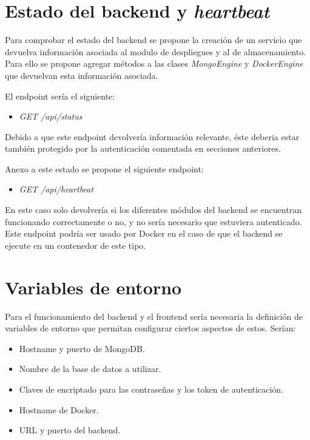 \section{Estado del backend y \textit{heartbeat}}


Para comprobar el estado del backend se propone la creación de un servicio que devuelva información asociada al modulo de despliegues y al de almacenamiento. Para ello se propone agregar métodos a las clases \textit{MongoEngine} y \textit{DockerEngine} que devuelvan esta información asociada.

\bigskip
El endpoint sería el siguiente:
\begin{itemize}
	\item \textit{GET /api/status}
\end{itemize}

\bigskip
Debido a que este endpoint devolvería información relevante, éste deberia estar también protegido por la autenticación comentada en secciones anteriores.

\bigskip
Anexo a este estado se propone el siguiente endpoint:
\begin{itemize}
	\item \textit{GET /api/heartbeat}
\end{itemize}


\bigskip
En este caso solo devolvería si los diferentes módulos del backend se encuentran funcionando correctamente o no, y no sería necesario que estuviera autenticado. Este endpoint podría ser usado por Docker en el caso de que el backend se ejecute en un contenedor de este tipo.



\section{Variables de entorno}


Para el funcionamiento del backend y el frontend sería necesaria la definición de variables de entorno que permitan configurar ciertos aspectos de estos. Serían:
\begin{itemize}
	\item Hostname y puerto de MongoDB.
	\item Nombre de la base de datos a utilizar.
	\item Claves de encriptado para las contraseñas y los token de autenticación.
	\item Hostname de Docker.
	\item URL y puerto del backend.
\end{itemize}





